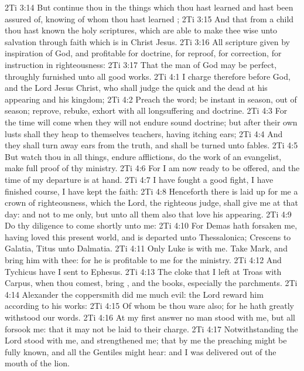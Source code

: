 \vs 2Ti 3:14 But continue thou in the things which thou hast learned and hast been assured of, knowing of whom thou hast learned ;
\vs 2Ti 3:15 And that from a child thou hast known the holy scriptures, which are able to make thee wise unto salvation through faith which is in Christ Jesus.
\vs 2Ti 3:16 All scripture  given by inspiration of God, and  profitable for doctrine, for reproof, for correction, for instruction in righteousness:
\vs 2Ti 3:17 That the man of God may be perfect, throughly furnished unto all good works.
\vs 2Ti 4:1 I charge  therefore before God, and the Lord Jesus Christ, who shall judge the quick and the dead at his appearing and his kingdom;
\vs 2Ti 4:2 Preach the word; be instant in season, out of season; reprove, rebuke, exhort with all longsuffering and doctrine.
\vs 2Ti 4:3 For the time will come when they will not endure sound doctrine; but after their own lusts shall they heap to themselves teachers, having itching ears;
\vs 2Ti 4:4 And they shall turn away  ears from the truth, and shall be turned unto fables.
\vs 2Ti 4:5 But watch thou in all things, endure afflictions, do the work of an evangelist, make full proof of thy ministry.
\vs 2Ti 4:6 For I am now ready to be offered, and the time of my departure is at hand.
\vs 2Ti 4:7 I have fought a good fight, I have finished  course, I have kept the faith:
\vs 2Ti 4:8 Henceforth there is laid up for me a crown of righteousness, which the Lord, the righteous judge, shall give me at that day: and not to me only, but unto all them also that love his appearing.
\vs 2Ti 4:9 Do thy diligence to come shortly unto me:
\vs 2Ti 4:10 For Demas hath forsaken me, having loved this present world, and is departed unto Thessalonica; Crescens to Galatia, Titus unto Dalmatia.
\vs 2Ti 4:11 Only Luke is with me. Take Mark, and bring him with thee: for he is profitable to me for the ministry.
\vs 2Ti 4:12 And Tychicus have I sent to Ephesus.
\vs 2Ti 4:13 The cloke that I left at Troas with Carpus, when thou comest, bring , and the books,  especially the parchments.
\vs 2Ti 4:14 Alexander the coppersmith did me much evil: the Lord reward him according to his works:
\vs 2Ti 4:15 Of whom be thou ware also; for he hath greatly withstood our words.
\vs 2Ti 4:16 At my first answer no man stood with me, but all  forsook me:  that it may not be laid to their charge.
\vs 2Ti 4:17 Notwithstanding the Lord stood with me, and strengthened me; that by me the preaching might be fully known, and  all the Gentiles might hear: and I was delivered out of the mouth of the lion.
